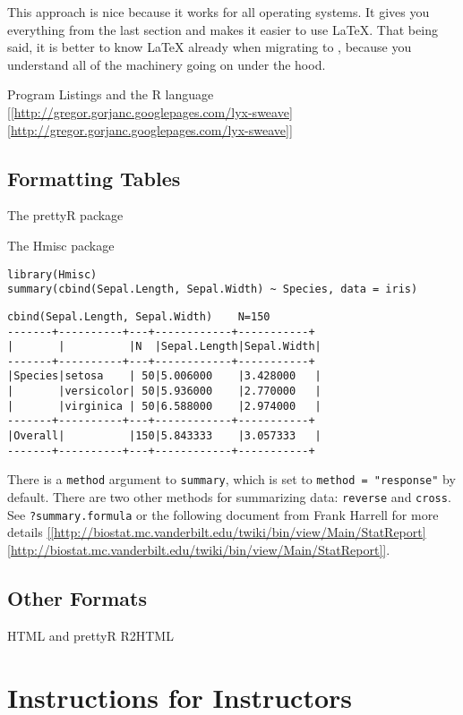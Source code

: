 \documentclass[captions=tableheading]{scrbook}
\begin{document}
This approach is nice because it works for all operating  systems. It gives you everything from the last section and makes it easier to use \LaTeX{}. That being said, it is better to know \LaTeX{} already when migrating to \LyX{}, because you understand all of the machinery going on under the hood.

Program Listings and the \textsf{R} language
\url{[[http://gregor.gorjanc.googlepages.com/lyx-sweave][http://gregor.gorjanc.googlepages.com/lyx-sweave]]}
\section{Formatting Tables \label{sec:Formatting-Tables}}
\label{sec-7-3}


The prettyR package 

The Hmisc package


\begin{verbatim}
library(Hmisc)
summary(cbind(Sepal.Length, Sepal.Width) ~ Species, data = iris)
\end{verbatim}


\begin{verbatim}
cbind(Sepal.Length, Sepal.Width)    N=150
-------+----------+---+------------+-----------+
|       |          |N  |Sepal.Length|Sepal.Width|
-------+----------+---+------------+-----------+
|Species|setosa    | 50|5.006000    |3.428000   |
|       |versicolor| 50|5.936000    |2.770000   |
|       |virginica | 50|6.588000    |2.974000   |
-------+----------+---+------------+-----------+
|Overall|          |150|5.843333    |3.057333   |
-------+----------+---+------------+-----------+
\end{verbatim}

There is a \texttt{method} argument to \texttt{summary}, which is set to \texttt{method = "response"} by default. There are two other methods for summarizing data: \texttt{reverse} and \texttt{cross}. See \texttt{?summary.formula} or the following document from Frank Harrell for more details \url{[[http://biostat.mc.vanderbilt.edu/twiki/bin/view/Main/StatReport][http://biostat.mc.vanderbilt.edu/twiki/bin/view/Main/StatReport]]}.
\section{Other Formats \label{sec:Other-Formats}}
\label{sec-7-4}


HTML and prettyR
R2HTML
\chapter{Instructions for Instructors}
\label{sec-8}
\end{document}
